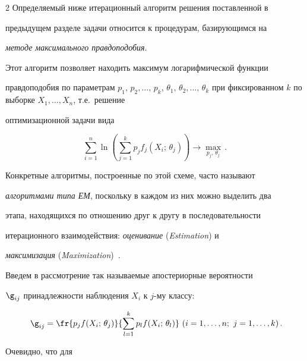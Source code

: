 \begin{multicols}{2}
Определяемый ниже итерационный алгоритм решения поставленной в


предыдущем разделе задачи относится к процедурам, базирующимся на


\textit{методе максимального правдоподобия}.





Этот алгоритм позволяет находить максимум логарифмической функции


правдоподобия по параметрам $p_1,\,p_2,\ldots ,\,p_k$, $\theta_1 ,\,\theta_2,\ldots ,\,


\theta_k$ при фиксированном $k$ по выборке $X_1, \ldots , X_n$, т.е.\ решение


оптимизационной задачи вида





\begin{equation} \sum\limits_{i=1}^n \ln \left ( \sum\limits_{j=1}^k p_j f_j


(X_i;\,\theta_j )\right ) \rightarrow \underset{p_j,\,\theta_j}{\max}\,.


\end{equation}





Конкретные алгоритмы, построенные по этой схеме, часто называют


\textit{алгоритмами типа ЕМ}, поскольку в каждом из них можно выделить два


этапа, находящихся по отношению друг к другу в последовательности


итерационного взаимодействия: \textit{оценивание} (\textit{Estimation}) и


\textit{максимизация} (\textit{Maximization})~\cite{4bat}.





Введем в рассмотрение так называемые апостериорные вероятности


$\g_{ij}$ принадлежности наблюдения $X_i$ к $j$-му классу:


\begin{equation} %


\g_{ij} = \fr{p_j f(X_i;\,\theta_j )}{\sum\limits_{l=1}^k p_l f(X_i;\,\theta_l 


)} \ (i=1,\ldots , n;\ j=1,\ldots ,k)\,.\!\!\end{equation} 


Очевидно, что для 



\end{multicols}
